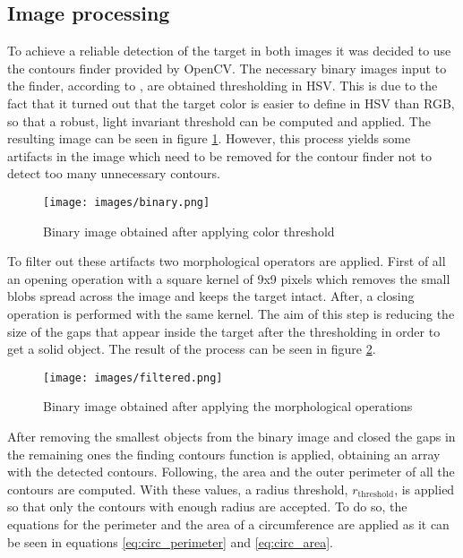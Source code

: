 \subsection{Image processing}
To achieve a reliable detection of the target in both images it was decided to use the contours finder provided by OpenCV.
The necessary binary images input to the finder, according to \cite{suzuki}, are obtained thresholding in HSV.
This is due to the fact that it turned out that the target color is easier to define in HSV than RGB, so that a robust, light invariant threshold can be computed and applied. The resulting image can be seen in figure \ref{fig:binary_image}.
However, this process yields some artifacts in the image which need to be removed for the contour finder not to detect too many unnecessary contours.

\begin{figure}[!ht]
    \centering
    \texttt{[image: images/binary.png]}
    \caption{Binary image obtained after applying color threshold}
    \label{fig:binary_image}
\end{figure}

To filter out these artifacts two morphological operators are applied. First of all an opening operation with a square kernel of 9x9 pixels which removes the small blobs spread across the image and keeps the target intact. After, a closing operation is performed with the same kernel. The aim of this step is reducing the size of the gaps that appear inside the target after the thresholding in order to get a solid object. The result of the process can be seen in figure \ref{fig:filtered_image}.

\begin{figure}[h]
    \centering
    \texttt{[image: images/filtered.png]}
    \caption{Binary image obtained after applying the morphological operations}
    \label{fig:filtered_image}
\end{figure}

After removing the smallest objects from the binary image and closed the gaps in the remaining ones the finding contours function is applied, obtaining an array with the detected contours. Following, the area and the outer perimeter of all the contours are computed. With these values, a radius threshold, $r_\mathrm{threshold}$, is applied so that only the contours with enough radius are accepted. To do so, the equations for the perimeter and the area of a circumference are applied as it can be seen in equations \ref{eq:circ_perimeter} and \ref{eq:circ_area}.


